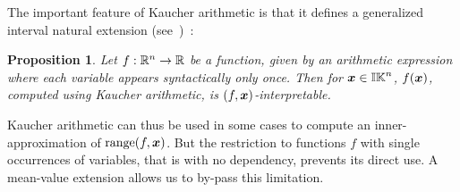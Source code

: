 \documentclass{sig-alternate-05-2015} %
\newtheorem{proposition}{Proposition}
\DeclareMathOperator{\range}{range}
\def\bbr{{\Bbb R}}
\def\K{{\Bbb I \Bbb K}}
\begin{document}
The important feature of Kaucher arithmetic is that it defines a generalized interval natural extension (see~\cite{gold1})~:
\begin{proposition}
\label{prop1}
Let $f : \bbr^n \rightarrow \bbr$ be a function, given by an arithmetic expression where each variable appears syntactically only once.
Then for $\x \in \K^n$, $f(\x)$, computed using Kaucher arithmetic, is $(f,\x)$-interpretable.
\end{proposition}
Kaucher arithmetic can thus be used in some cases to compute an inner-approximation of $\range(f,\x)$.
But the restriction to functions $f$ with single occurrences of variables, 
that is with no dependency, prevents its direct use. A mean-value extension allows us to by-pass this limitation.
\end{document}
